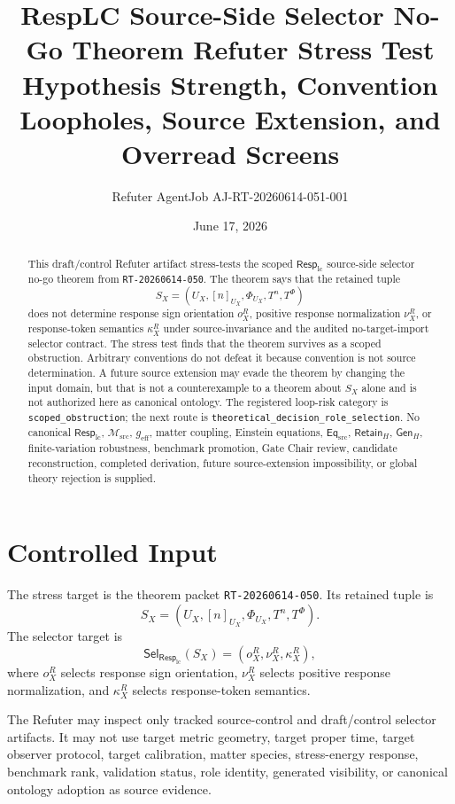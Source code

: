 \documentclass[11pt]{article}
\title{\textbf{RespLC Source-Side Selector No-Go Theorem Refuter Stress Test}\\[0.35em]
\large Hypothesis Strength, Convention Loopholes, Source Extension, and Overread Screens}
\author{Refuter AgentJob AJ-RT-20260614-051-001}
\date{June 17, 2026}
\newcommand{\EqSrc}{\mathsf{Eq}_{\mathrm{src}}}
\newcommand{\RetainH}{\mathsf{Retain}_{H}}
\newcommand{\GenH}{\mathsf{Gen}_{H}}
\newcommand{\Msrc}{\mathcal{M}_{\mathrm{src}}}
\newcommand{\RespLC}{\mathsf{Resp}_{\mathrm{lc}}}
\newcommand{\SelResp}{\mathsf{Sel}_{\RespLC}}
\newcommand{\geff}{g_{\mathrm{eff}}}
\begin{document}
\maketitle

\begin{abstract}
This draft/control Refuter artifact stress-tests the scoped
\(\RespLC\) source-side selector no-go theorem from
\texttt{RT-20260614-050}. The theorem says that the retained tuple
\[
    S_X=(U_X,[n]_{U_X},\Phi_{U_X},T^n,T^\Phi)
\]
does not determine response sign orientation \(o^R_X\), positive
response normalization \(\nu^R_X\), or response-token semantics
\(\kappa^R_X\) under source-invariance and the audited
no-target-import selector contract. The stress test finds that the
theorem survives as a scoped obstruction. Arbitrary conventions do not
defeat it because convention is not source determination. A future
source extension may evade the theorem by changing the input domain,
but that is not a counterexample to a theorem about \(S_X\) alone and
is not authorized here as canonical ontology. The registered
loop-risk category is \texttt{scoped\_obstruction}; the next route is
\texttt{theoretical\_decision\_role\_selection}. No canonical
\(\RespLC\), \(\Msrc\), \(\geff\), matter coupling, Einstein
equations, \(\EqSrc\), \(\RetainH\), \(\GenH\), finite-variation
robustness, benchmark promotion, Gate Chair review, candidate
reconstruction, completed derivation, future source-extension
impossibility, or global theory rejection is supplied.
\end{abstract}

\section{Controlled Input}

The stress target is the theorem packet
\texttt{RT-20260614-050}. Its retained tuple is
\[
    S_X=(U_X,[n]_{U_X},\Phi_{U_X},T^n,T^\Phi).
\]
The selector target is
\[
    \SelResp(S_X)=(o^R_X,\nu^R_X,\kappa^R_X),
\]
where \(o^R_X\) selects response sign orientation,
\(\nu^R_X\) selects positive response normalization, and
\(\kappa^R_X\) selects response-token semantics.

The Refuter may inspect only tracked source-control and draft/control
selector artifacts. It may not use target metric geometry, target
proper time, target observer protocol, target calibration, matter
species, stress-energy response, benchmark rank, validation status,
role identity, generated visibility, or canonical ontology adoption as
source evidence.
\end{document}
